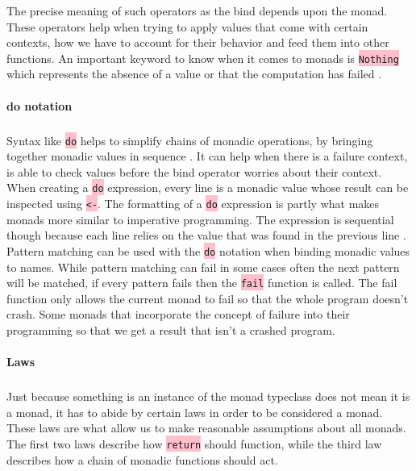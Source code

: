 \documentclass{article}
\begin{document}
The precise meaning of such operators as the bind depends upon the monad. These operators help when trying to apply values that come with certain contexts, how we have to account for their behavior and feed them into other functions. An important keyword to know when it comes to monads is \colorbox{pink}{ \lstinline{Nothing}} which represents the absence of a value or that the computation has failed \cite{FM}. 

\paragraph{do notation}

\subparagraph{}

Syntax like \colorbox{pink}{ \lstinline{do}} helps to simplify chains of monadic operations, by bringing together monadic values in sequence \cite{AM}. It can help when there is a failure context, is able to check values before the bind operator worries about their context. When creating a \colorbox{pink}{ \lstinline{do}} expression, every line is a monadic value whose result can be inspected using \colorbox{pink}{ \lstinline{<-}}. The formatting of a \colorbox{pink}{ \lstinline{do}} expression is partly what makes monads more similar to imperative programming. The expression is sequential though because each line relies on the value that was found in the previous line \cite{FM}. Pattern matching can be used with the \colorbox{pink}{ \lstinline{do}} notation when binding monadic values to names. While pattern matching can fail in some cases often the next pattern will be matched, if every pattern fails then the \colorbox{pink}{ \lstinline{fail}} function is called. The fail function only allows the current monad to fail so that the whole program doesn't crash. Some monads that incorporate the concept of failure into their programming so that we get a result that isn't a crashed program. 

\paragraph{Laws}

\subparagraph{}

Just because something is an instance of the monad typeclass does not mean it is a monad, it has to abide by certain laws in order to be considered a monad. These laws are what allow us to make reasonable assumptions about all monads. The first two laws describe how \colorbox{pink}{ \lstinline{return}} should function, while the third law describes how a chain of monadic functions should act.
\end{document}
